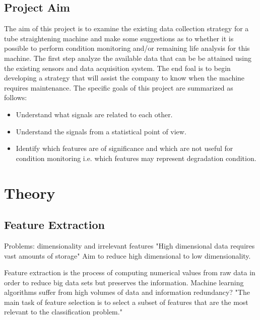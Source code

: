 \documentclass{article}
\begin{document}
\subsection{Project Aim}
The aim of this project is to examine the existing data collection strategy for a tube straightening machine and make some suggestions as to whether it is possible to perform condition monitoring and/or remaining life analysis for this machine. The first step analyze the available data that can be be attained using the existing sensors and data acquisition system. The end foal is to begin developing a strategy that will assist the company to know when the machine requires maintenance. The specific goals of this project are summarized as follows:
\begin{itemize}
\item Understand what signals are related to each other.
\item Understand the signals from a statistical point of view.
\item Identify which features are of significance and which are not useful for condition monitoring i.e. which features may represent degradation condition.
\end{itemize}
\clearpage  
\section{Theory}
\subsection{Feature Extraction}

Problems: dimensionality and irrelevant features
"High dimensional data requires vast amounts of storage"
Aim to reduce high dimensional to low dimensionality.

Feature extraction is the process of computing numerical values from raw data in order to reduce big data sets but preserves the information. Machine learning algorithms suffer from high volumes of data and information redundancy?
"The main task of feature selection is to select
a subset of features that are the most relevant to the classification problem." ~\cite{ahmed2020condition}
\end{document}
